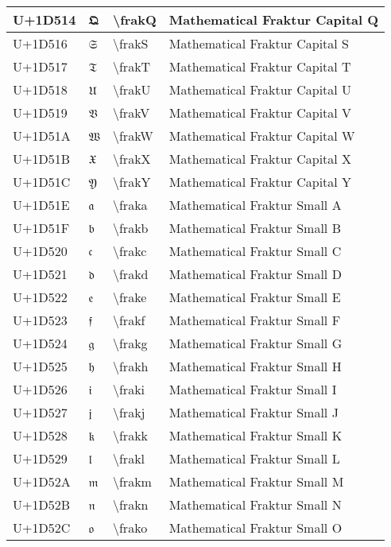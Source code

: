 \begin{table}[h]
\begin{tabulary}{\linewidth}{|L|L|L|L|}
\hline
U+1D514 & 𝔔 & {\textbackslash}frakQ & Mathematical Fraktur Capital Q \\
\hline
U+1D516 & 𝔖 & {\textbackslash}frakS & Mathematical Fraktur Capital S \\
\hline
U+1D517 & 𝔗 & {\textbackslash}frakT & Mathematical Fraktur Capital T \\
\hline
U+1D518 & 𝔘 & {\textbackslash}frakU & Mathematical Fraktur Capital U \\
\hline
U+1D519 & 𝔙 & {\textbackslash}frakV & Mathematical Fraktur Capital V \\
\hline
U+1D51A & 𝔚 & {\textbackslash}frakW & Mathematical Fraktur Capital W \\
\hline
U+1D51B & 𝔛 & {\textbackslash}frakX & Mathematical Fraktur Capital X \\
\hline
U+1D51C & 𝔜 & {\textbackslash}frakY & Mathematical Fraktur Capital Y \\
\hline
U+1D51E & 𝔞 & {\textbackslash}fraka & Mathematical Fraktur Small A \\
\hline
U+1D51F & 𝔟 & {\textbackslash}frakb & Mathematical Fraktur Small B \\
\hline
U+1D520 & 𝔠 & {\textbackslash}frakc & Mathematical Fraktur Small C \\
\hline
U+1D521 & 𝔡 & {\textbackslash}frakd & Mathematical Fraktur Small D \\
\hline
U+1D522 & 𝔢 & {\textbackslash}frake & Mathematical Fraktur Small E \\
\hline
U+1D523 & 𝔣 & {\textbackslash}frakf & Mathematical Fraktur Small F \\
\hline
U+1D524 & 𝔤 & {\textbackslash}frakg & Mathematical Fraktur Small G \\
\hline
U+1D525 & 𝔥 & {\textbackslash}frakh & Mathematical Fraktur Small H \\
\hline
U+1D526 & 𝔦 & {\textbackslash}fraki & Mathematical Fraktur Small I \\
\hline
U+1D527 & 𝔧 & {\textbackslash}frakj & Mathematical Fraktur Small J \\
\hline
U+1D528 & 𝔨 & {\textbackslash}frakk & Mathematical Fraktur Small K \\
\hline
U+1D529 & 𝔩 & {\textbackslash}frakl & Mathematical Fraktur Small L \\
\hline
U+1D52A & 𝔪 & {\textbackslash}frakm & Mathematical Fraktur Small M \\
\hline
U+1D52B & 𝔫 & {\textbackslash}frakn & Mathematical Fraktur Small N \\
\hline
U+1D52C & 𝔬 & {\textbackslash}frako & Mathematical Fraktur Small O \\

\end{tabulary}
\end{table}
